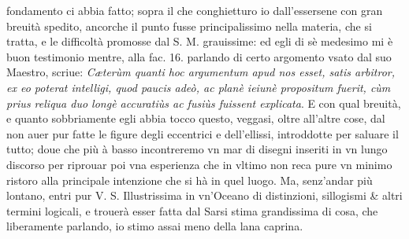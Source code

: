 \documentclass[11pt,twoside,openany]{book}
\begin{document}
fondamento ci abbia fatto; sopra il che conghietturo io dall'essersene con gran breuità spedito, ancorche il punto fusse principalissimo nella materia, che si tratta, e le difficoltà promosse dal S. M. grauissime: ed egli di sè medesimo mi è buon testimonio mentre, alla fac. 16. parlando di certo argomento vsato dal suo Maestro, scriue: \textit{Cæterùm quanti hoc argumentum apud nos esset, satis arbitror, ex eo poterat intelligi, quod paucis adeò, ac planè ieiunè propositum fuerit, cùm prius reliqua duo longè accuratiùs ac fusiùs fuissent explicata}. E con qual breuità, e quanto sobbriamente egli abbia tocco questo, veggasi, oltre all'altre cose, dal non auer pur fatte le figure degli eccentrici e dell'ellissi, introddotte per saluare il tutto; doue che più à basso incontreremo vn mar di disegni inseriti in vn lungo discorso per riprouar poi vna esperienza che in vltimo non reca pure vn minimo ristoro alla principale intenzione che si hà in quel luogo. Ma, senz'andar più lontano, entri pur V. S. Illustrissima in vn'Oceano di distinzioni, sillogismi \& altri termini logicali, e trouerà esser fatta dal Sarsi stima grandissima di cosa, che liberamente parlando, io stimo assai meno della lana caprina.
\end{document}
